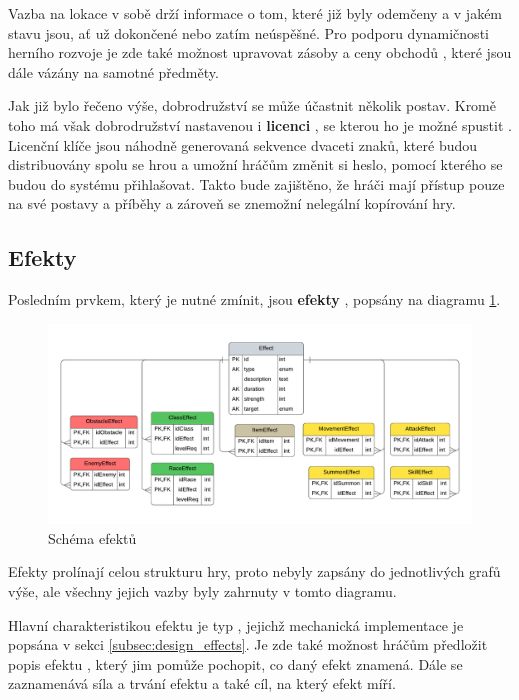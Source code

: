 Vazba na lokace  v sobě drží informace o tom, které již byly odemčeny  a v jakém stavu  jsou, ať už dokončené nebo zatím neúspěšné. Pro podporu dynamičnosti herního rozvoje je zde také možnost upravovat zásoby a ceny obchodů , které jsou dále vázány na samotné předměty.

Jak již bylo řečeno výše, dobrodružství se může účastnit několik postav. Kromě toho má však dobrodružství nastavenou i \textbf{licenci} , se kterou ho je možné spustit . Licenční klíče jsou náhodně generovaná sekvence dvaceti znaků, které budou distribuovány spolu se hrou a umožní hráčům změnit si heslo, pomocí kterého se budou do systému přihlašovat. Takto bude zajištěno, že hráči mají přístup pouze na své postavy a příběhy a zároveň se znemožní nelegální kopírování hry.


\subsection{Efekty}
\label{subsec:schema_effect}

Posledním prvkem, který je nutné zmínit, jsou \textbf{efekty} , popsány na diagramu \ref{diag:er_effect}.

\begin{figure}[h]
    \centering
    \includegraphics[scale=0.76]{../../shared/diagrams/er_effect.pdf}
    \caption{Schéma efektů}
    \label{diag:er_effect}
\end{figure}

Efekty prolínají celou strukturu hry, proto nebyly zapsány do jednotlivých grafů výše, ale všechny jejich vazby byly zahrnuty v tomto diagramu. 

Hlavní charakteristikou efektu je typ , jejichž mechanická implementace je popsána v sekci \ref{subsec:design_effects}. Je zde také možnost hráčům předložit popis efektu , který jim pomůže pochopit, co daný efekt znamená. Dále se zaznamenává síla a trvání efektu a také cíl, na který efekt míří.


